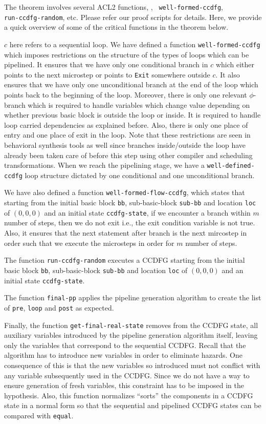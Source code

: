 The theorem involves several ACL2 functions, \eg, {\tt
well-formed-ccdfg}, \\
{\tt run-ccdfg-random}, etc. Please refer 
our proof scripts for details. Here, we provide a quick overview 
of some of the critical functions in the theorem
below.  

\noindent
$c$ here refers to a sequential loop. We have defined a function {\tt well-formed-ccdfg} 
which imposes restrictions on the structure of the types of loops which can be pipelined. It ensures 
that we have only one conditional branch in $c$ which either points to the next microstep or points to {\tt Exit} somewhere outside $c$. 
It also ensures that we have only one unconditional branch at the end of the loop which points back to the 
beginning of the loop. Moreover, there is only one relevant $\phi$-branch
which is required to handle variables which change value depending on whether previous basic block is outside the loop
or inside. It is required to handle loop carried dependencies as explained before. 
Also, there is only one place of entry and one place of exit in the loop. 
Note that these restrictions are seen in behavioral synthesis tools as well since branches inside/outside the 
loop have already been taken care of before this step using other compiler and scheduling transformations. 
When we reach the pipelining stage, 
we have a {\tt well-defined-ccdfg} loop structure dictated by one conditional and one unconditional branch.

We have also defined a function {\tt well\--formed\--flow\--ccdfg}, which states that starting from the initial basic block {\tt bb}, 
sub-basic-block {\tt sub-bb} and location {\tt loc} of $(0,0,0)$ and an initial state {\tt ccdfg\--state}, if we encounter a branch within $m$ number of steps, then we do not exit {i.e.}, the exit condition variable is not true.  Also, it ensures that the next statement after branch is the next mircostep in order such that we execute the microsteps in order for $m$ number of steps.

The function {\tt run-ccdfg-random} executes a CCDFG starting from the initial basic block {\tt bb}, 
sub-basic-block {\tt sub-bb} and location {\tt loc} of $(0,0,0)$ and an initial state {\tt ccdfg\--state}.

The function {\tt final-pp} applies the pipeline generation algorithm to create the  
list of {\tt pre}, {\tt loop} and {\tt post} as expected. 

Finally, the function {\tt get-final-real-state} removes from the
CCDFG state, all auxiliary variables introduced by
the pipeline generation algorithm itself, leaving only the
variables that correspond to the sequential
CCDFG. Recall that the algorithm has to introduce new variables
  in order to eliminate hazards.  One consequence of this is
  that the new variables so introduced must not conflict
  with any variable subsequently used in the CCDFG.  Since
  we do not have a way to ensure generation of fresh
  variables, this constraint has to be imposed in the
  hypothesis. Also, this function normalizes ``sorts'' the
components in a CCDFG state in a normal form so that the
sequential and pipelined CCDFG states can be compared with
{\tt equal}. 
 
